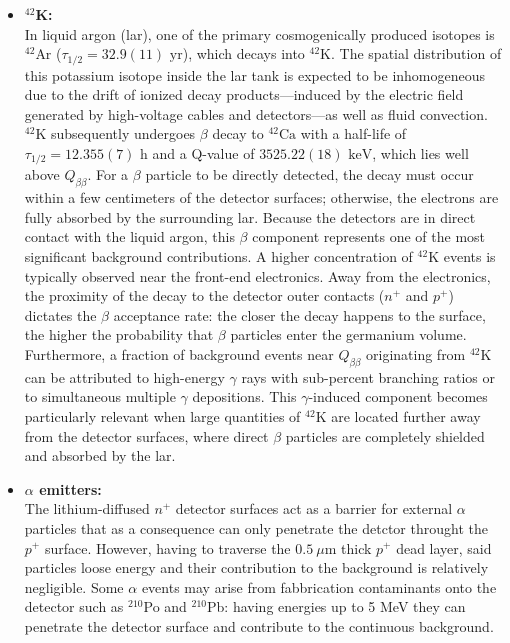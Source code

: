 \begin{itemize}
    \item \textbf{${}^{42}$K:}\\
            In liquid argon (\ac{lar}), one of the primary cosmogenically produced isotopes is ${}^{42}\text{Ar}$ ($\tau_{1/2} = 32.9(11)\text{ yr}$), which decays into ${}^{42}\text{K}$. The spatial distribution of this potassium isotope inside the \ac{lar} tank is expected to be inhomogeneous due to the drift of ionized decay products—induced by the electric field generated by high-voltage cables and detectors—as well as fluid convection. ${}^{42}\text{K}$ subsequently undergoes $\beta$ decay to ${}^{42}\text{Ca}$ with a half-life of $\tau_{1/2} = 12.355(7)\text{ h}$ and a Q-value of $3525.22(18)\text{ keV}$, which lies well above $Q_{\beta\beta}$. 
            For a $\beta$ particle to be directly detected, the decay must occur within a few centimeters of the detector surfaces; otherwise, the electrons are fully absorbed by the surrounding \ac{lar}. Because the detectors are in direct contact with the liquid argon, this $\beta$ component represents one of the most significant background contributions. A higher concentration of ${}^{42}\text{K}$ events is typically observed near the front-end electronics. Away from the electronics, the proximity of the decay to the detector outer contacts ($n^+$ and $p^+$) dictates the $\beta$ acceptance rate: the closer the decay happens to the surface, the higher the probability that $\beta$ particles enter the germanium volume. 
            Furthermore, a fraction of background events near $Q_{\beta\beta}$ originating from ${}^{42}\text{K}$ can be attributed to high-energy $\gamma$ rays with sub-percent branching ratios or to simultaneous multiple $\gamma$ depositions. This $\gamma$-induced component becomes particularly relevant when large quantities of ${}^{42}\text{K}$ are located further away from the detector surfaces, where direct $\beta$ particles are completely shielded and absorbed by the \ac{lar}.

    \item \textbf{$\alpha$ emitters:}\\
            The lithium-diffused $n^+$ detector surfaces act as a barrier for external $\alpha$ particles that as a consequence can only penetrate the detctor throught the $p^+$ surface. However, having to traverse the $0.5~\mu$m thick $p^+$ dead layer, said particles loose energy and their contribution to the background is relatively negligible. Some $\alpha$ events may arise from fabbrication contaminants onto the detector such as ${}^{210}$Po and ${}^{210}$Pb: having energies up to 5 MeV they can penetrate the detector surface and contribute to the continuous background.


\end{itemize}
